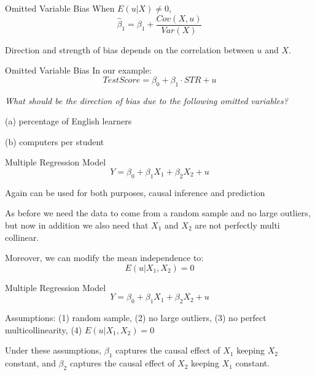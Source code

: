 \documentclass{./../div_teaching_slides}
\begin{document}
\begin{frame}{Omitted Variable Bias}
When $E(u|X)\neq 0$,
$$ \hat{\beta}_1 = \beta_1 +  \frac{Cov(X,u)}{Var(X)} $$

\vspace{1em}
Direction and strength of bias depends on the correlation between $u$ and $X$. \\ \vspace{0.5em} %
\end{frame}

\begin{frame}{Omitted Variable Bias}
In our example:
$$ Test Score = \beta_0 + \beta_1 \cdot STR + u $$

\textit{What should be the direction of bias due to the following omitted variables?}  \\ \vspace{0.25em}
\begin{witemize}
  \item[(a)] percentage of English learners
  \item[(b)] computers per student
\end{witemize}
\end{frame}

\begin{frame}{Multiple Regression Model}
$$ Y = \beta_0 + \beta_1 X_{1} + \beta_2 X_{2} + u  $$ 
\begin{witemize}
  \item Again can be used for both purposes, causal inference and prediction
  \item As before we need the data to come from a random sample and no large outliers, but now in addition we also need that $X_1$ and $X_2$ are not perfectly multi collinear. 
  \item Moreover, we can modify the mean independence to:
  $$ E(u | X_1, X_2)=0 $$
\end{witemize}
\end{frame}

\begin{frame}{Multiple Regression Model}
$$ Y = \beta_0 + \beta_1 X_{1} + \beta_2 X_{2} + u  $$ 
\begin{witemize}
  \item Assumptions: (1) random sample, (2) no large outliers, (3) no perfect multicollinearity, (4) $E(u | X_1, X_2)=0$
  \item Under these assumptions, $\beta_1$ captures the causal effect of $X_1$ keeping $X_2$ constant, and $\beta_2$ captures the causal effect of $X_2$ keeping $X_1$ constant. 
\end{witemize}
\end{frame}
\end{document}

